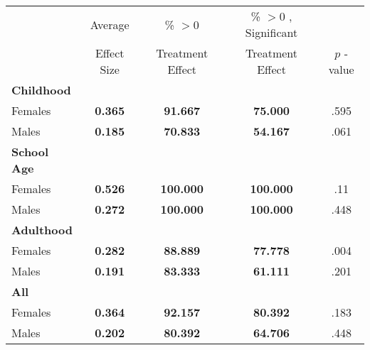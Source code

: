\begin{tabular}{l c c c c}
\toprule
 & Average & \% $ >0 $ & \% $ >0 $ , Significant & \citet{Rosenbaum_2005_Distribution_JRSS} \\
 & Effect Size & Treatment Effect & Treatment Effect & $ p $ -value \\
\midrule
\textbf{Childhood} & & & & \\
\quad Females &  \textbf{    0.365} & \textbf{   91.667} & \textbf{   75.000} & .595 \\
\quad Males &  \textbf{    0.185} & \textbf{   70.833} & \textbf{   54.167} & .061 \\
\midrule
\textbf{School Age} & & & & \\
\quad Females &  \textbf{    0.526} & \textbf{  100.000} & \textbf{  100.000} & .11 \\
\quad Males &  \textbf{    0.272} & \textbf{  100.000} & \textbf{  100.000} & .448 \\
\midrule
\textbf{Adulthood} & & & & \\
\quad Females &  \textbf{    0.282} & \textbf{   88.889} & \textbf{   77.778} & .004 \\
\quad Males &  \textbf{    0.191} & \textbf{   83.333} & \textbf{   61.111} & .201 \\
\midrule
\textbf{All} & & & & \\
\quad Females &  \textbf{    0.364} & \textbf{   92.157} & \textbf{   80.392} & .183 \\
\quad Males &  \textbf{    0.202} & \textbf{   80.392} & \textbf{   64.706} & .448 \\
\bottomrule
\end{tabular}
